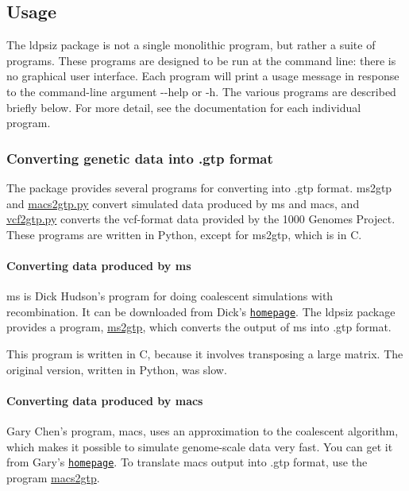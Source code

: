\subsection*{Usage}

The {\ttfamily ldpsiz} package is not a single monolithic program, but rather a suite of programs. These programs are designed to be run at the command line\+: there is no graphical user interface. Each program will print a usage message in response to the command-\/line argument {\ttfamily -\/-\/help} or {\ttfamily -\/h}. The various programs are described briefly below. For more detail, see the documentation for each individual program.

\subsubsection*{Converting genetic data into .gtp format}

The package provides several programs for converting into .gtp format. {\ttfamily ms2gtp} and {\ttfamily \hyperlink{macs2gtp_8py}{macs2gtp.\+py}} convert simulated data produced by {\ttfamily ms} and {\ttfamily macs}, and {\ttfamily \hyperlink{vcf2gtp_8py}{vcf2gtp.\+py}} converts the vcf-\/format data provided by the 1000 Genomes Project. These programs are written in Python, except for {\ttfamily ms2gtp}, which is in C.

\paragraph*{Converting data produced by {\ttfamily ms}}

{\ttfamily ms} is Dick Hudson's program for doing coalescent simulations with recombination. It can be downloaded from Dick's \href{http://home.uchicago.edu/rhudson1/source.html}{\tt homepage}. The {\ttfamily ldpsiz} package provides a program, \hyperlink{ms2gtp_8c}{ms2gtp}, which converts the output of {\ttfamily ms} into .gtp format.

This program is written in C, because it involves transposing a large matrix. The original version, written in Python, was slow.

\paragraph*{Converting data produced by {\ttfamily macs}}

Gary Chen's program, {\ttfamily macs}, uses an approximation to the coalescent algorithm, which makes it possible to simulate genome-\/scale data very fast. You can get it from Gary's \href{http://www-hsc.usc.edu/~garykche}{\tt homepage}. To translate {\ttfamily macs} output into .gtp format, use the program \hyperlink{macs2gtp_8py}{macs2gtp}.

